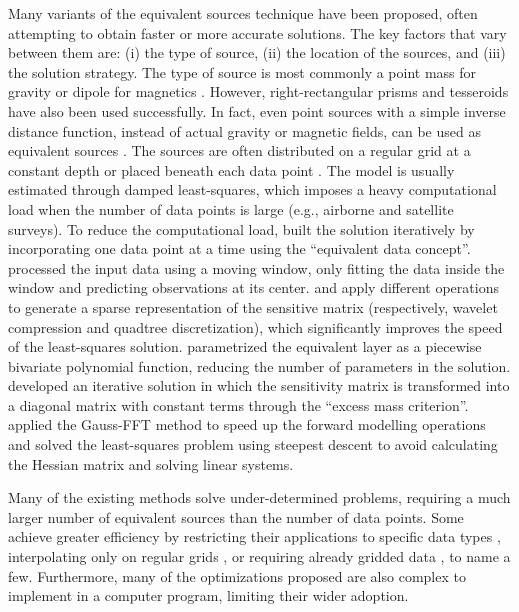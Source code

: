 Many variants of the equivalent sources technique have been proposed, often
attempting to obtain faster or more accurate solutions.
The key factors that vary between them are: (i) the type of source, (ii)
the location of the sources, and (iii) the solution strategy.
The type of source is most commonly a point mass for gravity or dipole for
magnetics \citep[e.g.,~][]{vonfrese1981, silva1986, mendonca1994, siqueira2017}.
However, right-rectangular prisms \citep[e.g.,][]{barnes2011, jirigalatu2019,
li2020} and tesseroids \citep{bouman2016} have also been used successfully.
In fact, even point sources with a simple inverse distance function, instead of
actual gravity or magnetic fields, can be used as
equivalent sources \citep{cordell1992}.
The sources are often distributed on a regular grid at a constant depth
\citep[e.g.,~][]{leao1989, barnes2011, oliveira2013}
or placed beneath each data point \citep[e.g.,~][]{cordell1992, siqueira2017}.
The model is usually estimated through damped least-squares, which imposes a
heavy computational load when the number of data points is large (e.g.,
airborne and satellite surveys).
To reduce the computational load, \citet{mendonca1994} built the solution
iteratively by incorporating one data point at a time using the ``equivalent
data concept''.
\citet{leao1989} processed the input data using a moving window, only fitting the
data inside the window and predicting observations at its center.
\citet{li2010} and \citet{barnes2011} apply different operations to generate a
sparse representation of the sensitive matrix (respectively, wavelet
compression and quadtree discretization), which significantly improves the
speed of the least-squares solution.
\citet{oliveira2013} parametrized the equivalent layer as a piecewise bivariate
polynomial function, reducing the number of parameters in the solution.
\citet{siqueira2017} developed an iterative solution in which the sensitivity
matrix is transformed into a diagonal matrix with constant terms through the
``excess mass criterion''.
\citet{jirigalatu2019} applied the Gauss-FFT method to speed up the forward
modelling operations and solved the least-squares problem using steepest
descent to avoid calculating the Hessian matrix and solving linear systems.

Many of the existing methods solve under-determined problems, requiring a much
larger number of equivalent sources than the number of data points.
Some achieve greater efficiency by restricting their applications
to specific data types \citep{siqueira2017},
interpolating only on regular grids \citep{leao1989},
or requiring already gridded data \citep{takahashi2020},
to name a few.
Furthermore, many of the optimizations proposed are also complex to implement
in a computer program, limiting their wider adoption.


